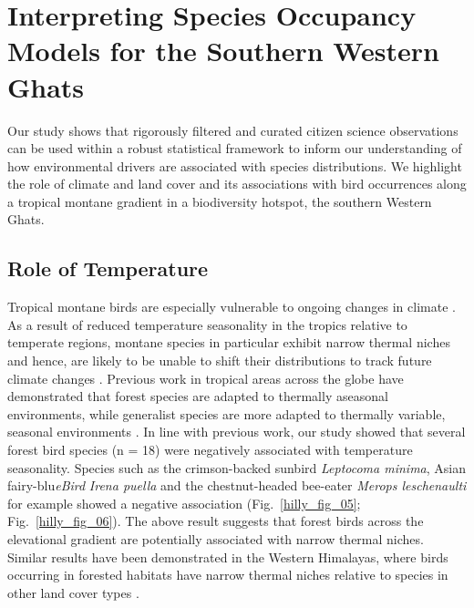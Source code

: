 \section*{Interpreting Species Occupancy Models for the Southern Western Ghats}

Our study shows that rigorously filtered and curated citizen science observations can be used within a robust statistical framework to inform our understanding of how environmental drivers are associated with species distributions.
We highlight the role of climate and land cover and its associations with bird occurrences along a tropical montane gradient in a biodiversity hotspot, the southern Western Ghats.

\subsection*{Role of Temperature}

Tropical montane birds are especially vulnerable to ongoing changes in climate \citep{sekercioglu2007,perez2016,freeman2018,srinivasan2018}.
As a result of reduced temperature seasonality in the tropics relative to temperate regions, montane species in particular exhibit narrow thermal niches and hence, are likely to be unable to shift their distributions to track future climate changes \citep{janzen1967,deutsch2008,tewksbury2008,jankowski2013}.
Previous work in tropical areas across the globe have demonstrated that forest species are adapted to thermally aseasonal environments, while generalist species are more adapted to thermally variable, seasonal environments \citep{frishkoff2016,chan2016}.
In line with previous work, our study showed that several forest bird species (n = 18) were negatively associated with temperature seasonality.
Species such as the crimson-backed sunbird \textit{Leptocoma minima}, Asian fairy-blu\textit{eBird} \textit{Irena puella} and the chestnut-headed bee-eater \textit{Merops leschenaulti} for example showed a negative association (Fig.~\ref{hilly_fig_05}; Fig.~\ref{hilly_fig_06}).
The above result suggests that forest birds across the elevational gradient are potentially associated with narrow thermal niches.
Similar results have been demonstrated in the Western Himalayas, where birds occurring in forested habitats have narrow thermal niches relative to species in other land cover types \citep{srinivasan2019}.

